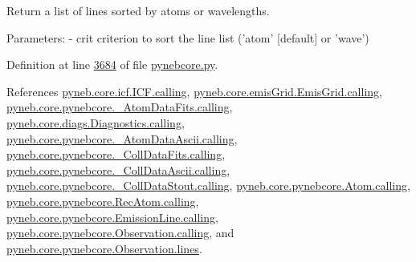 \begin{DoxyVerb}Return a list of lines sorted by atoms or wavelengths.

Parameters:
    - crit   criterion to sort the line list ('atom' [default] or 'wave')\end{DoxyVerb}
 

Definition at line \hyperlink{pynebcore_8py_source_l03684}{3684} of file \hyperlink{pynebcore_8py_source}{pynebcore.\-py}.



References \hyperlink{icf_8py_source_l00016}{pyneb.\-core.\-icf.\-I\-C\-F.\-calling}, \hyperlink{emis_grid_8py_source_l00044}{pyneb.\-core.\-emis\-Grid.\-Emis\-Grid.\-calling}, \hyperlink{pynebcore_8py_source_l00097}{pyneb.\-core.\-pynebcore.\-\_\-\-Atom\-Data\-Fits.\-calling}, \hyperlink{diags_8py_source_l00169}{pyneb.\-core.\-diags.\-Diagnostics.\-calling}, \hyperlink{pynebcore_8py_source_l00318}{pyneb.\-core.\-pynebcore.\-\_\-\-Atom\-Data\-Ascii.\-calling}, \hyperlink{pynebcore_8py_source_l00585}{pyneb.\-core.\-pynebcore.\-\_\-\-Coll\-Data\-Fits.\-calling}, \hyperlink{pynebcore_8py_source_l00936}{pyneb.\-core.\-pynebcore.\-\_\-\-Coll\-Data\-Ascii.\-calling}, \hyperlink{pynebcore_8py_source_l01156}{pyneb.\-core.\-pynebcore.\-\_\-\-Coll\-Data\-Stout.\-calling}, \hyperlink{pynebcore_8py_source_l01229}{pyneb.\-core.\-pynebcore.\-Atom.\-calling}, \hyperlink{pynebcore_8py_source_l02643}{pyneb.\-core.\-pynebcore.\-Rec\-Atom.\-calling}, \hyperlink{pynebcore_8py_source_l03385}{pyneb.\-core.\-pynebcore.\-Emission\-Line.\-calling}, \hyperlink{pynebcore_8py_source_l03541}{pyneb.\-core.\-pynebcore.\-Observation.\-calling}, and \hyperlink{pynebcore_8py_source_l03542}{pyneb.\-core.\-pynebcore.\-Observation.\-lines}.


